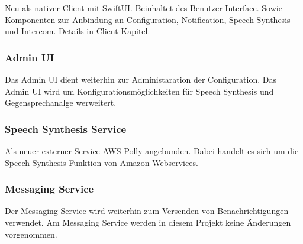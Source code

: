 Neu als nativer Client mit SwiftUI.
Beinhaltet des Benutzer Interface.
Sowie Komponenten zur Anbindung an Configuration, Notification, Speech Synthesis und Intercom.
Details in Client Kapitel. \\

\subsubsection*{Admin UI}
Das Admin UI dient weiterhin zur Administaration der Configuration.
Das Admin UI wird um Konfigurationsmöglichkeiten für Speech Synthesis und Gegensprechanalge werweitert. \\


\subsubsection*{Speech Synthesis Service}
Als neuer externer Service AWS Polly angebunden.
Dabei handelt es sich um die Speech Synthesis Funktion von Amazon Webservices. \\


\subsubsection*{Messaging Service}
Der Messaging Service wird weiterhin zum Versenden von Benachrichtigungen verwendet.
Am Messaging Service werden in diesem Projekt keine Änderungen vorgenommen. \\

\clearpage
